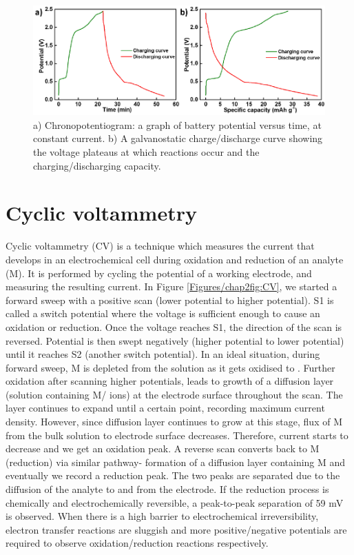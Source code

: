 \begin{figure}[th!]
\centering
\includegraphics[width=\textwidth]{Figures/chap2fig/ChrononCDC}
\caption{a) Chronopotentiogram: a graph of battery potential versus time, at constant current. b) A galvanostatic charge/discharge curve showing the voltage plateaus at which reactions occur and the charging/discharging capacity.}
\label{Figures/chap2fig:ChrononCDC}
\end{figure}

\section{Cyclic voltammetry}
Cyclic voltammetry (CV) is a technique which measures the current that develops in an electrochemical cell during oxidation and reduction of an analyte (M). It is performed by cycling the potential of a working electrode, and measuring the resulting current. In Figure \ref{Figures/chap2fig:CV}, we started a forward sweep with a positive scan (lower potential to higher potential). S1 is called a switch potential where the voltage is sufficient enough to cause an oxidation or reduction. Once the voltage reaches S1, the direction of the scan is reversed. Potential is then swept negatively (higher potential to lower potential) until it reaches S2 (another switch potential). In an ideal situation, during forward sweep, M is depleted from the solution as it gets oxidised to . Further oxidation after scanning higher potentials, leads to growth of a diffusion layer (solution containing M/ ions) at the electrode surface throughout the scan. The layer continues to expand until a certain point, recording maximum current density. However, since diffusion layer continues to grow at this stage, flux of M from the bulk solution to electrode surface decreases. Therefore, current starts to decrease and we get an oxidation peak. A reverse scan converts  back to M (reduction) via similar pathway- formation of a diffusion layer containing M and eventually we record a reduction peak. The two peaks are separated due to the diffusion of the analyte to and from the electrode. If the reduction process is chemically and electrochemically reversible, a peak-to-peak separation of 59 mV is observed. When there is a high barrier to electrochemical irreversibility, electron transfer reactions are sluggish and more positive/negative potentials are required to observe oxidation/reduction reactions respectively. 


